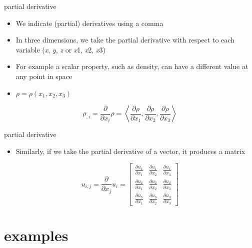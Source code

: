 \documentclass[
  letterpaper,
  ignorenonframetext,
  aspectratio=43,
  handout,
  12pt]{beamer}
\providecommand{\tightlist}{%
  \setlength{\itemsep}{0pt}\setlength{\parskip}{0pt}}
\providecommand{\tightlist}{%
\setlength{\itemsep}{0pt}\setlength{\parskip}{0pt}}
\begin{document}
\begin{frame}{partial derivative}
\protect\hypertarget{partial-derivative}{}
\begin{itemize}
\tightlist
\item
  We indicate (partial) derivatives using a comma
\item
  In three dimensions, we take the partial derivative with respect to
  each variable (\emph{x}, \emph{y}, \emph{z} or \emph{x}1, \emph{x}2,
  \emph{x}3)
\item
  For example a scalar property, such as density, can have a different
  value at any point in space
\item
  \(\rho = \rho(x_1, x_2, x_3)\)
\end{itemize}

\[\rho_{,i} = \frac{\partial}{\partial x_i} \rho = \left\langle \frac{\partial \rho }{\partial x_1}, \frac{\partial \rho }{\partial x_2}, \frac{\partial \rho }{\partial x_3} \right\rangle\]
\end{frame}

\begin{frame}{partial derivative}
\protect\hypertarget{partial-derivative-1}{}
\begin{itemize}
\tightlist
\item
  Similarly, if we take the partial derivative of a vector, it produces
  a matrix
\end{itemize}

\[u_{i,j} = \frac{\partial}{\partial x_j} u_i = \begin{bmatrix}
\frac{\partial u_1}{\partial x_1} & \frac{\partial u_1}{\partial x_2} & \frac{\partial u_1}{\partial x_3}\\
\frac{\partial u_2}{\partial x_1} & \frac{\partial u_2}{\partial x_2} & \frac{\partial u_2}{\partial x_3}\\
\frac{\partial u_3}{\partial x_1} & \frac{\partial u_3}{\partial x_2} & \frac{\partial u_3}{\partial x_3}
\end{bmatrix}\]
\end{frame}

\hypertarget{examples}{%
\section{examples}\label{examples}}
\end{document}
